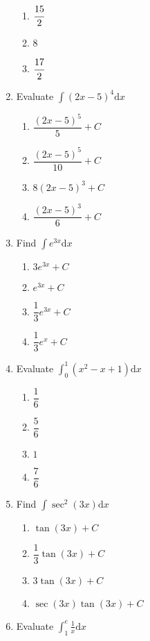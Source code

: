 \begin{multicols}{2}
\begin{enumerate}[label={\arabic*.}]
\begin{enumerate}[label={\Alph*.}]
        \item \(\cfrac{15}{2}\)
        \item \(8\)
        \item \(\cfrac{17}{2}\)
      \end{enumerate}
    \item Evaluate \(\displaystyle \int (2x-5)^4 \mathrm{d}x\)
      \begin{enumerate}[label={\Alph*.}]
        \item \(\dfrac{(2x-5)^5}{5} + C\)
        \item \(\dfrac{(2x-5)^5}{10} + C\)
        \item \(8(2x-5)^3 + C\)
        \item \(\dfrac{(2x-5)^3}{6} + C\)
      \end{enumerate}
    \item Find \(\displaystyle \int e^{3x} \mathrm{d}x\)
      \begin{enumerate}[label={\Alph*.}]
        \item \(3e^{3x} + C\)
        \item \(e^{3x} + C\)
        \item \(\dfrac{1}{3}e^{3x} + C\)
        \item \(\dfrac{1}{3}e^{x} + C\)
      \end{enumerate}
    \item Evaluate \(\displaystyle \int_{0}^{1} (x^2 - x + 1) \mathrm{d}x\)
      \begin{enumerate}[label={\Alph*.}]
        \item \(\dfrac{1}{6}\)
        \item \(\dfrac{5}{6}\)
        \item \(1\)
        \item \(\dfrac{7}{6}\)
      \end{enumerate}
    \item Find \(\displaystyle \int \sec^2(3x) \mathrm{d}x\)
      \begin{enumerate}[label={\Alph*.}]
        \item \(\tan(3x) + C\)
        \item \(\dfrac{1}{3}\tan(3x) + C\)
        \item \(3\tan(3x) + C\)
        \item \(\sec(3x)\tan(3x) + C\)
      \end{enumerate}
    \item Evaluate \(\displaystyle \int_{1}^{e} \frac{1}{x} \mathrm{d}x\)
      \begin{enumerate}[label={\Alph*.}]

\end{enumerate}
\end{enumerate}
\end{multicols}
